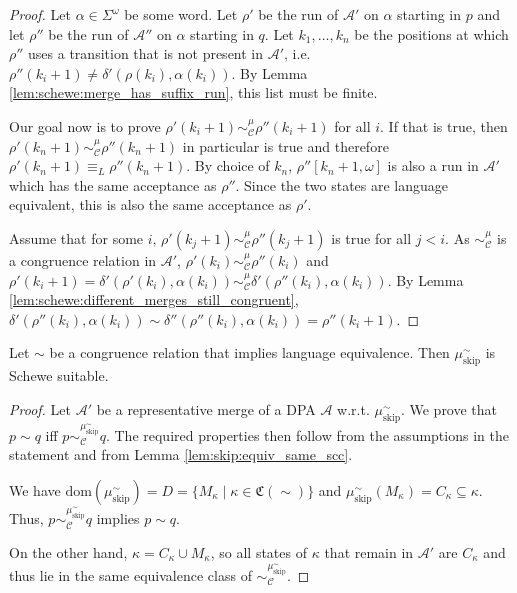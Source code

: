 \begin{proof}
	Let $\alpha \in \Sigma^\omega$ be some word. Let $\rho'$ be the run of $\mathcal{A}'$ on $\alpha$ starting in $p$ and let $\rho''$ be the run of $\mathcal{A}''$ on $\alpha$ starting in $q$. Let $k_1, \dots, k_n$ be the positions at which $\rho''$ uses a transition that is not present in $\mathcal{A}'$, i.e. $\rho''(k_i + 1) \neq \delta'(\rho(k_i), \alpha(k_i))$. By Lemma \ref{lem:schewe:merge_has_suffix_run}, this list must be finite. 
	
	Our goal now is to prove $\rho'(k_i + 1) \sim_\mathcal{C}^\mu \rho''(k_i + 1)$ for all $i$. If that is true, then $\rho'(k_n + 1) \sim_\mathcal{C}^\mu \rho''(k_n + 1)$ in particular is true and therefore $\rho'(k_n + 1) \equiv_L \rho''(k_n + 1)$. By choice of $k_n$, $\rho''[k_n + 1, \omega]$ is also a run in $\mathcal{A}'$ which has the same acceptance as $\rho''$. Since the two states are language equivalent, this is also the same acceptance as $\rho'$.
	
	Assume that for some $i$, $\rho'(k_j + 1) \sim_\mathcal{C}^\mu \rho''(k_j + 1)$ is true for all $j < i$. As $\sim_\mathcal{C}^\mu$ is a congruence relation in $\mathcal{A}'$, $\rho'(k_i) \sim_\mathcal{C}^\mu \rho''(k_i)$ and $\rho'(k_i + 1) = \delta'(\rho'(k_i), \alpha(k_i)) \sim_\mathcal{C}^\mu \delta'(\rho''(k_i), \alpha(k_i))$. By Lemma \ref{lem:schewe:different_merges_still_congruent}, $\delta'(\rho''(k_i), \alpha(k_i)) \sim \delta''(\rho''(k_i), \alpha(k_i)) = \rho''(k_i + 1)$.
\end{proof}


\begin{lem}
	Let $\sim$ be a congruence relation that implies language equivalence. Then $\mu_\text{skip}^\sim$ is Schewe suitable.
	\label{lem:schewe:skip_suitable}
\end{lem}

\begin{proof}
	Let $\mathcal{A}'$ be a representative merge of a DPA $\mathcal{A}$ w.r.t. $\mu_\text{skip}^\sim$. We prove that $p \sim q$ iff $p \sim_\mathcal{C}^{\mu_\text{skip}^\sim} q$. The required properties then follow from the assumptions in the statement and from Lemma \ref{lem:skip:equiv_same_scc}.
	
	We have $\text{dom}(\mu_\text{skip}^\sim) = D = \{M_\kappa \mid \kappa \in \mathfrak{C}(\sim)\}$ and $\mu_\text{skip}^\sim(M_\kappa) = C_\kappa \subseteq \kappa$. Thus, $p \sim_\mathcal{C}^{\mu_\text{skip}^\sim} q$ implies $p \sim q$.
	
	On the other hand, $\kappa = C_\kappa \cup M_\kappa$, so all states of $\kappa$ that remain in $\mathcal{A}'$ are $C_\kappa$ and thus lie in the same equivalence class of $\sim_\mathcal{C}^{\mu_\text{skip}^\sim}.$
\end{proof}


